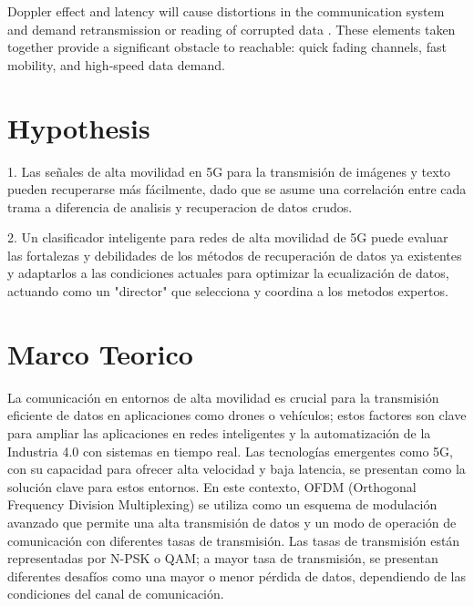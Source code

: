 \documentclass{article}
\begin{document}
Doppler effect and latency will cause distortions in the communication system and demand retransmission or reading of corrupted data \cite{FastFading}.
These elements taken together provide a significant obstacle to reachable: quick fading channels, fast mobility, and high-speed data demand.

\section{Hypothesis}

1. Las señales de alta movilidad en 5G para la transmisión de imágenes y texto pueden recuperarse más fácilmente, 
 dado que se asume una correlación entre cada trama a diferencia de analisis y recuperacion de datos crudos. 

2. Un clasificador inteligente para redes de alta movilidad de 5G puede evaluar las fortalezas y debilidades de los métodos de recuperación 
    de datos ya existentes y adaptarlos a las condiciones actuales para optimizar la ecualización de datos, 
    actuando como un "director" que selecciona y coordina a los metodos expertos.

\section{Marco Teorico}

La comunicación en entornos de alta movilidad es crucial para la transmisión eficiente de datos 
en aplicaciones como drones o vehículos; estos factores son clave para ampliar las aplicaciones 
en redes inteligentes y la automatización de la Industria 4.0 con sistemas en tiempo real. 
Las tecnologías emergentes como 5G, con su capacidad para ofrecer alta velocidad y baja latencia, 
se presentan como la solución clave para estos entornos. En este contexto, OFDM (Orthogonal Frequency Division Multiplexing) 
se utiliza como un esquema de modulación avanzado que permite una alta transmisión de datos y un modo de operación de comunicación 
con diferentes tasas de transmisión. Las tasas de transmisión están representadas por N-PSK o QAM; a mayor tasa de transmisión, 
se presentan diferentes desafíos como una mayor o menor pérdida de datos, dependiendo de las condiciones del canal de comunicación.
\end{document}
